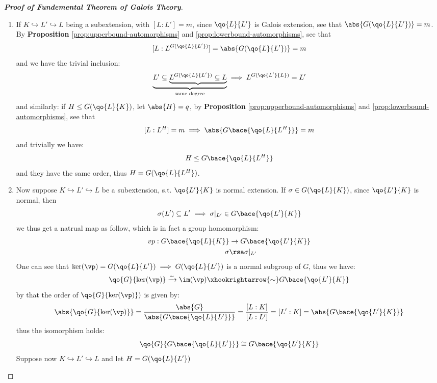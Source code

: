 \begin{proof}[\textbf{Proof of Fundemental Theorem of Galois Theory}]
	\leavevmode
	\begin{enumerate}
		\item If \( K \hookrightarrow L' \hookrightarrow L \) being a subextension, with \( [L:L'] = m \), since
		      \( \qo{L}{L'} \) is Galois extension, see that \( \abs{G(\qo{L}{L'})} = m \). By \textbf{Proposition} \ref{prop:upperbound-automorphisms}
		      and \ref{prop:lowerbound-automorphisms}, see that
		      \[
			      [L:L^{G(\qo{L}{L'})}] = \abs{G(\qo{L}{L'})} = m
		      \]
		      and we have the trivial inclusion:
		      \[
			      \underbrace{L' \subseteq \underbrace{L^{G(\qo{L}{L'})} \subseteq L}}_{\text{same degree}} \implies L^{G(\qo{L'}{L})} = L'
		      \]
		      and similarly: if \( H \leq G(\qo{L}{K}) \), let \( \abs{H} = q \), by
		      \textbf{Proposition} \ref{prop:upperbound-automorphisms} and
		      \ref{prop:lowerbound-automorphisms}, see that
		      \[
			      [L:L^H] = m \implies \abs{G\bace{\qo{L}{L^H}}} = m
		      \]
		      and trivially we have:
		      \[
			      H\leq G\bace{\qo{L}{L^H}}
		      \]
		      and they have the same order, thus \( H = G(\qo{L}{L^H}) \).
		\item Now suppose \( K \hookrightarrow L' \hookrightarrow L \) be a subextension, s.t. \(
		      \qo{L'}{K} \) is normal extension. If \( \sigma \in G(\qo{L}{K}) \), since \( \qo{L'}{K} \) is normal, then
		      \[
			      \sigma(L') \subseteq L' \implies \sigma |_{L'} \in G\bace{\qo{L'}{K}}
		      \]
		      we thus get a natrual map as follow, which is in fact a group homomorphism:
		      \[
			      \begin{aligned}
				      vp: G\bace{\qo{L}{K}} & \to G\bace{\qo{L'}{K}} \\
				      \sigma                & \rsa \sigma |_{L'}
			      \end{aligned}
		      \]
		      One can see that \( \ker(\vp) = G(\qo{L}{L'}) \implies G(\qo{L}{L'}) \) is a normal subgroup
		      of \( G \), thus we have:
		      \[
			      \qo{G}{\ker(\vp)} \xrightarrow{\sim} \im(\vp) \xhookrightarrow{\sim} G\bace{\qo{L'}{K}}
		      \]
		      by that the order of \( \qo{G}{\ker(\vp)}) \) is given by:
		      \[
			      \abs{\qo{G}{\ker(\vp)}} = \frac{\abs{G}}{\abs{G\bace{\qo{L}{L'}}}} = \frac{[L:K]}{[L:L']}
			      = [L':K] = \abs{G\bace{\qo{L'}{K}}}
		      \]
		      thus the isomorphism holds:
		      \[
			      \qo{G}{G\bace{\qo{L}{L'}}} \cong G\bace{\qo{L'}{K}}
		      \]
		      Suppose now \( K \hookrightarrow L' \hookrightarrow L \) and let \( H = G(\qo{L}{L'}) \)

\end{enumerate}
\end{proof}
